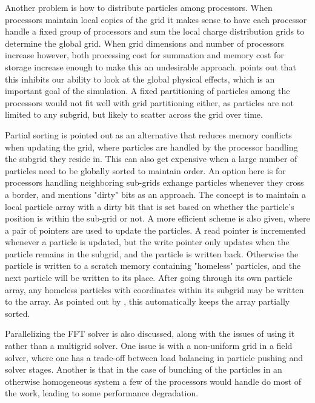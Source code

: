 \documentclass[twocolumn]{article} %
\begin{document}
		Another problem is how to distribute particles among processors. When processors maintain local copies of the grid it
		makes sense to have each processor handle a fixed group of processors and sum the local charge distribution grids to
		determine the global grid. When grid dimensions and number of processors increase however, both processing cost for
		summation and memory cost for storage increase enough to make this an undesirable approach. \cite{elster94} points out that this
		inhibits our ability to look at the global physical effects, which is an important goal of the simulation.
		A fixed partitioning of particles among the processors would not fit well with grid partitioning either, as particles
		are not limited to any subgrid, but likely to scatter across the grid over time.
		
		Partial sorting is pointed out as an alternative that reduces memory conflicts when updating the grid, where particles
		are handled by the processor handling the subgrid they reside in. This can also get expensive when a large number of
		particles need to be globally sorted to maintain order. An option here is for processors handling neighboring
		sub-grids exhange particles whenever they cross a border, and \cite{elster94} mentions "dirty" bits as an approach.
		The concept is to maintain a local particle array with a dirty bit that is set based on whether the particle's
		position is within the sub-grid or not. A more efficient scheme is also given, where a pair of pointers are used to
		update the particles. A read pointer is incremented whenever a particle is updated, but the write pointer only updates
		when the particle remains in the subgrid, and the particle is written back. Otherwise the particle is written to a
		scratch memory containing "homeless" particles, and the next particle will be written to its place. After going
		through its own particle array, any homeless particles with coordinates within its subgrid may be written to the
		array. As pointed out by \cite{elster94}, this automatically keeps the array partially sorted.
		
		Parallelizing the FFT solver is also discussed, along with the issues of using it rather than a multigrid solver. One
		issue is with a non-uniform grid in a field solver, where one has a trade-off between load balancing in particle
		pushing and solver stages. Another is that in the case of bunching of the particles in an otherwise homogeneous system
		a few of the processors would handle do most of the work, leading to some performance degradation.
		
\end{document}
